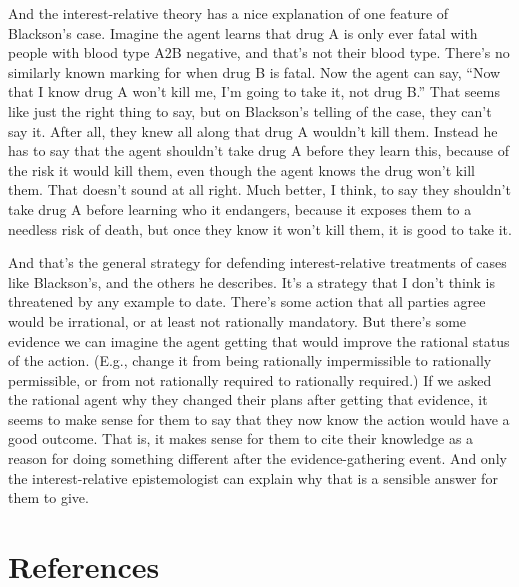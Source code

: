 \documentclass[
  11pt,
  letterpaper,
  DIV=11,
  numbers=noendperiod]{scrartcl}
\begin{document}
And the interest-relative theory has a nice explanation of one feature
of Blackson's case. Imagine the agent learns that drug A is only ever
fatal with people with blood type A2B negative, and that's not their
blood type. There's no similarly known marking for when drug B is fatal.
Now the agent can say, ``Now that I know drug A won't kill me, I'm going
to take it, not drug B.'' That seems like just the right thing to say,
but on Blackson's telling of the case, they can't say it. After all,
they knew all along that drug A wouldn't kill them. Instead he has to
say that the agent shouldn't take drug A before they learn this, because
of the risk it would kill them, even though the agent knows the drug
won't kill them. That doesn't sound at all right. Much better, I think,
to say they shouldn't take drug A before learning who it endangers,
because it exposes them to a needless risk of death, but once they know
it won't kill them, it is good to take it.

And that's the general strategy for defending interest-relative
treatments of cases like Blackson's, and the others he describes. It's a
strategy that I don't think is threatened by any example to date.
There's some action that all parties agree would be irrational, or at
least not rationally mandatory. But there's some evidence we can imagine
the agent getting that would improve the rational status of the action.
(E.g., change it from being rationally impermissible to rationally
permissible, or from not rationally required to rationally required.) If
we asked the rational agent why they changed their plans after getting
that evidence, it seems to make sense for them to say that they now know
the action would have a good outcome. That is, it makes sense for them
to cite their knowledge as a reason for doing something different after
the evidence-gathering event. And only the interest-relative
epistemologist can explain why that is a sensible answer for them to
give.

\section*{References}\label{references}
\end{document}
